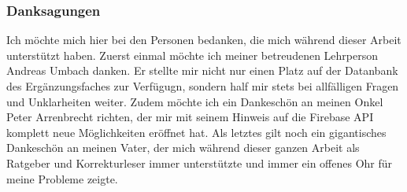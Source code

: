 \documentclass[../main.tex]{subfiles}
\begin{document}
\subsubsection*{Danksagungen}
Ich möchte mich hier bei den Personen bedanken, die mich während dieser Arbeit unterstützt haben. Zuerst einmal möchte ich meiner betreudenen Lehrperson Andreas Umbach danken. Er stellte mir nicht nur einen Platz auf der Datanbank des Ergänzungsfaches zur Verfügugn, sondern half mir stets bei allfälligen Fragen und Unklarheiten weiter. Zudem möchte ich ein Dankeschön an  meinen Onkel Peter Arrenbrecht richten, der mir mit seinem Hinweis auf die Firebase API komplett neue Möglichkeiten eröffnet hat. Als letztes gilt noch ein gigantisches Dankeschön an meinen Vater, der mich während dieser ganzen Arbeit als Ratgeber und Korrekturleser immer unterstützte und immer ein offenes Ohr für meine Probleme zeigte.
\end{document}
